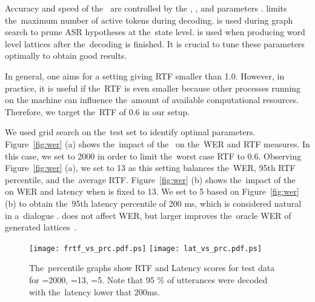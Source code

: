 

Accuracy and speed of the~ are controlled by the ,   , and  parameters \cite{povey2011kaldi}.
 limits the~maximum number of active tokens during decoding.
 is used during graph search to prune ASR hypotheses at the~state level.
 is used when producing word level lattices after the~decoding is finished.
It is crucial to tune these parameters optimally to obtain good results.

In general, one aims for a setting giving RTF smaller than 1.0.
However, in practice, it is useful if the~RTF is even smaller because other processes running on the machine can influence the~amount of available computational resources.
Therefore, we target the~RTF of 0.6 in our setup.

We used grid search on the~test set to identify optimal parameters.
Figure~\ref{fig:wer} (a) shows the~impact of the~ on the~WER and RTF measures.
In this case, we set  to 2000 in order to limit the~worst case RTF to 0.6.
Observing Figure~\ref{fig:wer} (a), we set  to 13 as this setting balances the~WER, 95th RTF percentile, and the~average RTF.
Figure~\ref{fig:wer} (b) shows the~impact of the~ on WER and latency when  is fixed to 13.
We set  to 5 based on Figure~\ref{fig:wer} (b) to obtain the~95th latency percentile of 200 ms, which is considered natural in a~dialogue \cite{skantze2009incremental}.
 does not affect WER, but larger  improves the~oracle WER of generated lattices~\cite{povey2012generating}.

\begin{figure*}[t]
    \begin{center}
    \texttt{[image: frtf\_vs\_prc.pdf.ps]}
    \texttt{[image: lat\_vs\_prc.pdf.ps]}
    \caption{The~percentile graphs show RTF and Latency scores for test data for =2000, =13, =5.
Note that 95 \% of utterances were decoded with the~latency lower that 200ms.}
    \label{fig:prc}
    \end{center}
\end{figure*}

